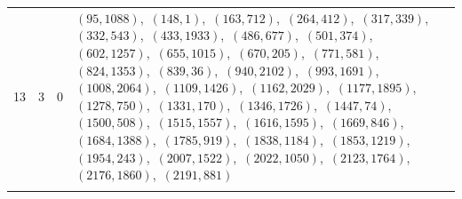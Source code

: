\documentclass[11pt]{article}
\begin{document}
\begin{longtable}{@{}rrl>{\raggedright\arraybackslash}p{}@{}}
13 & 3 & $0$ & $(95,1088)$,\allowbreak\ $(148,1)$,\allowbreak\ $(163,712)$,\allowbreak\ $(264,412)$,\allowbreak\ $(317,339)$,\allowbreak\ $(332,543)$,\allowbreak\ $(433,1933)$,\allowbreak\ $(486,677)$,\allowbreak\ $(501,374)$,\allowbreak\ $(602,1257)$,\allowbreak\ $(655,1015)$,\allowbreak\ $(670,205)$,\allowbreak\ $(771,581)$,\allowbreak\ $(824,1353)$,\allowbreak\ $(839,36)$,\allowbreak\ $(940,2102)$,\allowbreak\ $(993,1691)$,\allowbreak\ $(1008,2064)$,\allowbreak\ $(1109,1426)$,\allowbreak\ $(1162,2029)$,\allowbreak\ $(1177,1895)$,\allowbreak\ $(1278,750)$,\allowbreak\ $(1331,170)$,\allowbreak\ $(1346,1726)$,\allowbreak\ $(1447,74)$,\allowbreak\ $(1500,508)$,\allowbreak\ $(1515,1557)$,\allowbreak\ $(1616,1595)$,\allowbreak\ $(1669,846)$,\allowbreak\ $(1684,1388)$,\allowbreak\ $(1785,919)$,\allowbreak\ $(1838,1184)$,\allowbreak\ $(1853,1219)$,\allowbreak\ $(1954,243)$,\allowbreak\ $(2007,1522)$,\allowbreak\ $(2022,1050)$,\allowbreak\ $(2123,1764)$,\allowbreak\ $(2176,1860)$,\allowbreak\ $(2191,881)$\\
\addlinespace[3pt]
\end{longtable}
\endgroup
\end{document}
